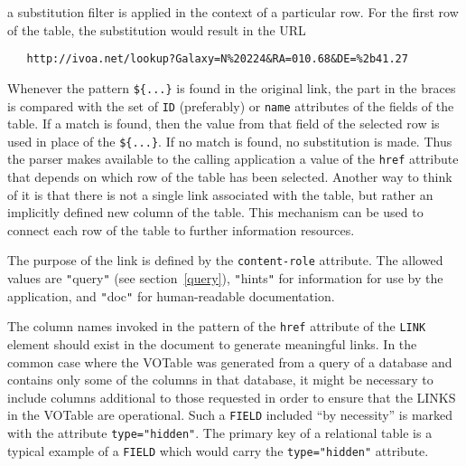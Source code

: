 \documentclass[11pt,a4paper]{ivoa}
\def\Aref#1{section~\ref{#1}}
\let\fg=\color
\def\attr#1{{\tt{\fg{DarkRed}#1}}}
\def\elem#1{{\tt{\fg{DarkRed}#1}}}
\def\attrval#1#2{{\tt{\fg{DarkRed}#1}="{\fg{DarkPurple}#2}"}}
\def\literalvalue#1{{\tt"}{{\fg{DarkPurple}#1}}{\tt"}}
\begin{document}
{{{\noindent a substitution filter is applied in the context of a particular row.
For the first row of the table, the substitution would result in the URL

\begin{verbatim}
   http://ivoa.net/lookup?Galaxy=N%20224&RA=010.68&DE=%2b41.27
\end{verbatim}

Whenever the pattern {\tt{\$\{...\}}}
is found in the original link, the part in the braces is compared
with the set of {\attr{ID}} (preferably) or \attr{name}
attributes of the fields of the table. If a match is found, then the
value from that field of the selected row is used in place of the
{\tt{\$\{...\}}}. If no match is found, no substitution is made. Thus the
parser makes available to the calling application a value of the {\attr{href}}
attribute that depends on which row of the table has been selected.
Another way to think of it is that there is not a single link
associated with the table, but rather an implicitly defined new
column of the table. This mechanism can be used to connect each row
of the table to further information resources.



The purpose of the link is defined by the {\attr{content-role}}
attribute. The allowed values are {\literalvalue{query}}
(see \Aref{query}),
{\literalvalue{hints}} for information for use by the application,
and {\literalvalue{doc}} for  human-readable documentation.

The column names invoked in the pattern of the \attr{href} attribute
of the \elem{LINK} element should exist in the document to
generate meaningful links.
In the common case where the VOTable was generated from a query
of a database and contains only some of the columns in that
database, it might be necessary to include columns additional to
those requested in order to ensure that the LINKS in the VOTable
are operational.
Such a \elem{FIELD} included ``by necessity'' is marked with
the attribute \attrval{type}{hidden}. The primary key of
a relational table is a typical example of a \elem{FIELD}
which would carry the \attrval{type}{hidden} attribute.

}}}
\end{document}
